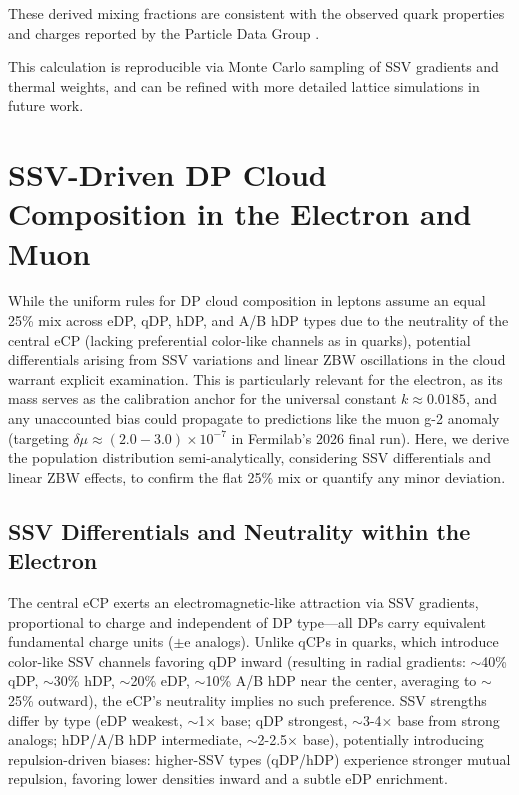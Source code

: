 \documentclass{article}
\begin{document}
These derived mixing fractions are consistent with the observed quark properties and charges reported by the Particle Data Group \cite{pdg2024}.

This calculation is reproducible via Monte Carlo sampling of SSV gradients and thermal weights, and can be refined with more detailed lattice simulations in future work.

\section{SSV-Driven DP Cloud Composition in the Electron and Muon}

While the uniform rules for DP cloud composition in leptons assume an equal 25\% mix across eDP, qDP, hDP, and A/B hDP types due to the neutrality of the central eCP (lacking preferential color-like channels as in quarks), potential differentials arising from SSV variations and linear ZBW oscillations in the cloud warrant explicit examination. This is particularly relevant for the electron, as its mass serves as the calibration anchor for the universal constant $k \approx 0.0185$, and any unaccounted bias could propagate to predictions like the muon g-2 anomaly (targeting $\delta\mu \approx (2.0-3.0) \times 10^{-7}$ in Fermilab's 2026 final run). Here, we derive the population distribution semi-analytically, considering SSV differentials and linear ZBW effects, to confirm the flat 25\% mix or quantify any minor deviation.

\subsection{SSV Differentials and Neutrality within the Electron}
The central eCP exerts an electromagnetic-like attraction via SSV gradients, proportional to charge and independent of DP type—all DPs carry equivalent fundamental charge units ($\pm$e analogs). Unlike qCPs in quarks, which introduce color-like SSV channels favoring qDP inward (resulting in radial gradients: $\sim$40\% qDP, $\sim$30\% hDP, $\sim$20\% eDP, $\sim$10\% A/B hDP near the center, averaging to $\sim$25\% outward), the eCP's neutrality implies no such preference. SSV strengths differ by type (eDP weakest, $\sim$1$\times$ base; qDP strongest, $\sim$3-4$\times$ base from strong analogs; hDP/A/B hDP intermediate, $\sim$2-2.5$\times$ base), potentially introducing repulsion-driven biases: higher-SSV types (qDP/hDP) experience stronger mutual repulsion, favoring lower densities inward and a subtle eDP enrichment.
\end{document}
